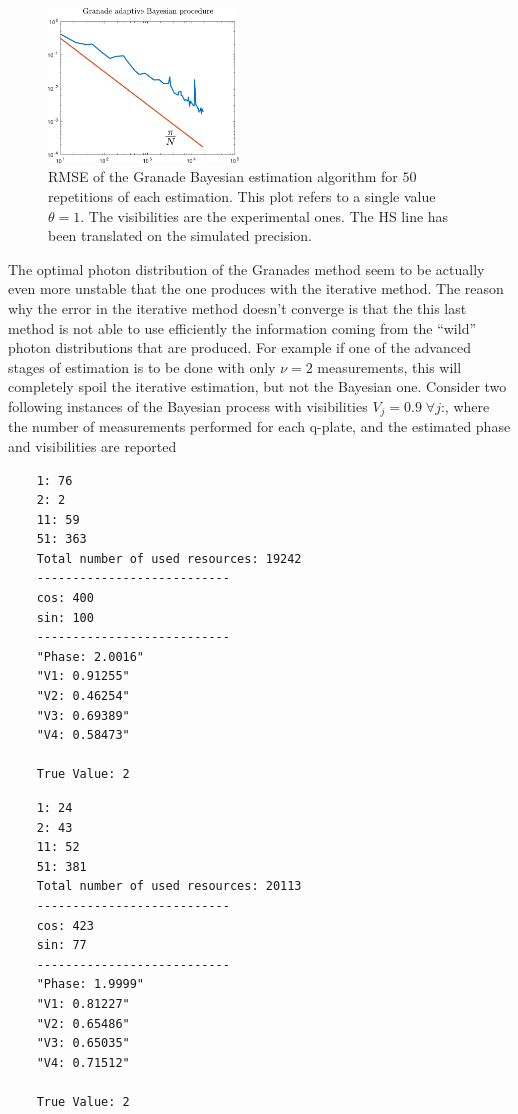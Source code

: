 \documentclass[aps, pra, 10pt, twocolumn, superscriptaddress,floatfix]{revtex4-1}
\begin{document}
\begin{figure}[!t]
	\begin{center}
		\includegraphics[width=0.45\textwidth]{overHSTruevisibility2phases.pdf}
	\end{center}
	\caption{RMSE of the Granade Bayesian estimation algorithm for $50$ repetitions of each estimation. This plot refers to a single value $\theta = 1$. The visibilities are the experimental ones. The HS line has been translated on the simulated precision.}
	\label{fig:overHSTruevisibility2phases}
\end{figure}
%
The optimal photon distribution of the Granades method seem to be actually even more unstable that the one produces with the iterative method. The reason why the error in the iterative method doesn't converge is that the this last method is not able to use efficiently the information coming from the ``wild'' photon distributions that are produced. For example if one of the advanced stages of estimation is to be done with only $\nu = 2$ measurements, this will completely spoil the iterative estimation, but not the Bayesian one. Consider two following instances of the Bayesian process with visibilities $V_j = 0.9 \; \forall j$:, where the number of measurements performed for each q-plate, and the estimated phase and visibilities are reported
%
\begin{verbatim}
	1: 76
	2: 2
	11: 59
	51: 363
	Total number of used resources: 19242
	---------------------------
	cos: 400
	sin: 100
	---------------------------
	"Phase: 2.0016"
	"V1: 0.91255"
	"V2: 0.46254"
	"V3: 0.69389"
	"V4: 0.58473"
	
	True Value: 2
\end{verbatim}
%
\begin{verbatim}
	1: 24
	2: 43
	11: 52
	51: 381
	Total number of used resources: 20113
	---------------------------
	cos: 423
	sin: 77
	---------------------------
	"Phase: 1.9999"
	"V1: 0.81227"
	"V2: 0.65486"
	"V3: 0.65035"
	"V4: 0.71512"
	
	True Value: 2
\end{verbatim}
\end{document}
